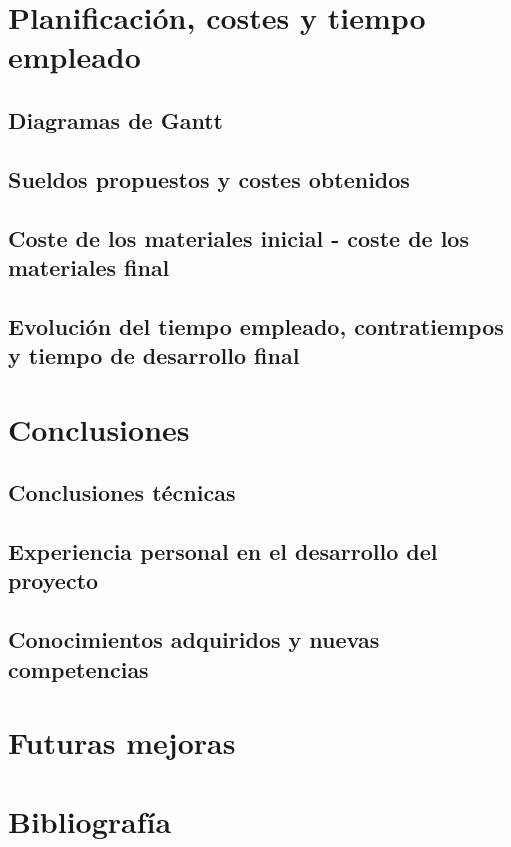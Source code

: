 \chapter{Planificación, costes y tiempo empleado}

\section{Diagramas de Gantt}

\section{Sueldos propuestos y costes obtenidos}

\section{Coste de los materiales inicial - coste de los materiales final}

%
\section{Evolución del tiempo empleado, contratiempos y tiempo de desarrollo final}
\label{sec:3derr}


\chapter{Conclusiones}

\section{Conclusiones técnicas}

\section{Experiencia personal en el desarrollo del proyecto}

\section{Conocimientos adquiridos y nuevas competencias}


\chapter{Futuras mejoras}


\chapter*{Bibliografía}


\appendix
